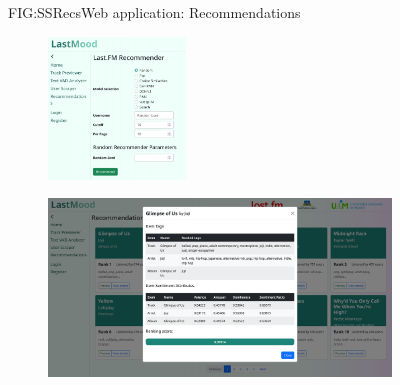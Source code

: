 \begin{figure}[Web application: Recommendations]{FIG:SSRecs}{Web application: Recommendations}
    \begin{subfigure}[SBFIG:SSRecsForm]{Track recommender form}{\includegraphics[width=0.4\textwidth]{img/SSRecsForm.png}}
    \end{subfigure}
    \begin{subfigure}[SBFIG:SSRecsDetails]{Track details modal}{\includegraphics[width=1\textwidth]{img/SSRecsDetails.png}}
    \end{subfigure}
\end{figure}
